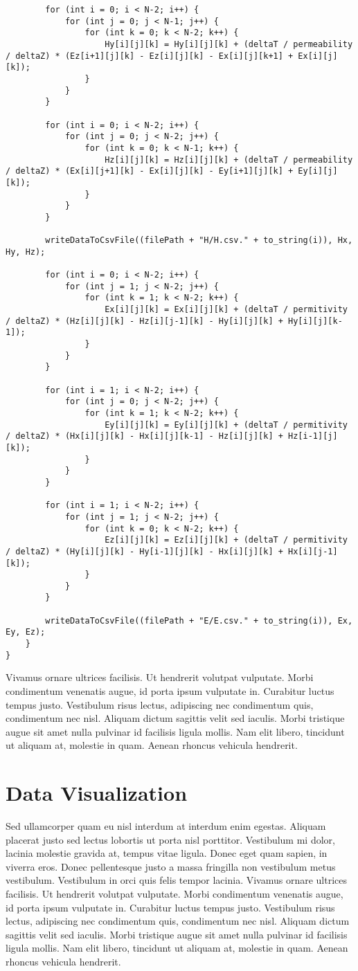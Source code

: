 \begin{verbatim}
		for (int i = 0; i < N-2; i++) {
			for (int j = 0; j < N-1; j++) {
				for (int k = 0; k < N-2; k++) {
					Hy[i][j][k] = Hy[i][j][k] + (deltaT / permeability / deltaZ) * (Ez[i+1][j][k] - Ez[i][j][k] - Ex[i][j][k+1] + Ex[i][j][k]);
				}
			}
		}
		
		for (int i = 0; i < N-2; i++) {
			for (int j = 0; j < N-2; j++) {
				for (int k = 0; k < N-1; k++) {
					Hz[i][j][k] = Hz[i][j][k] + (deltaT / permeability / deltaZ) * (Ex[i][j+1][k] - Ex[i][j][k] - Ey[i+1][j][k] + Ey[i][j][k]);
				}
			}
		}
		
		writeDataToCsvFile((filePath + "H/H.csv." + to_string(i)), Hx, Hy, Hz);
		
		for (int i = 0; i < N-2; i++) {
			for (int j = 1; j < N-2; j++) {
				for (int k = 1; k < N-2; k++) {
					Ex[i][j][k] = Ex[i][j][k] + (deltaT / permitivity / deltaZ) * (Hz[i][j][k] - Hz[i][j-1][k] - Hy[i][j][k] + Hy[i][j][k-1]);
				}
			}
		}
		
		for (int i = 1; i < N-2; i++) {
			for (int j = 0; j < N-2; j++) {
				for (int k = 1; k < N-2; k++) {
					Ey[i][j][k] = Ey[i][j][k] + (deltaT / permitivity / deltaZ) * (Hx[i][j][k] - Hx[i][j][k-1] - Hz[i][j][k] + Hz[i-1][j][k]);
				}
			}
		}
		
		for (int i = 1; i < N-2; i++) {
			for (int j = 1; j < N-2; j++) {
				for (int k = 0; k < N-2; k++) {
					Ez[i][j][k] = Ez[i][j][k] + (deltaT / permitivity / deltaZ) * (Hy[i][j][k] - Hy[i-1][j][k] - Hx[i][j][k] + Hx[i][j-1][k]);
				}
			}
		}
		
		writeDataToCsvFile((filePath + "E/E.csv." + to_string(i)), Ex, Ey, Ez);
	}
}
\end{verbatim}


Vivamus ornare ultrices facilisis. Ut hendrerit volutpat vulputate. Morbi condimentum venenatis augue, id porta ipsum vulputate in. Curabitur luctus tempus justo. Vestibulum risus lectus, adipiscing nec condimentum quis, condimentum nec nisl. Aliquam dictum sagittis velit sed iaculis. Morbi tristique augue sit amet nulla pulvinar id facilisis ligula mollis. Nam elit libero, tincidunt ut aliquam at, molestie in quam. Aenean rhoncus vehicula hendrerit.

\section{Data Visualization}
Sed ullamcorper quam eu nisl interdum at interdum enim egestas. Aliquam placerat justo sed lectus lobortis ut porta nisl porttitor. Vestibulum mi dolor, lacinia molestie gravida at, tempus vitae ligula. Donec eget quam sapien, in viverra eros. Donec pellentesque justo a massa fringilla non vestibulum metus vestibulum. Vestibulum in orci quis felis tempor lacinia. Vivamus ornare ultrices facilisis. Ut hendrerit volutpat vulputate. Morbi condimentum venenatis augue, id porta ipsum vulputate in. Curabitur luctus tempus justo. Vestibulum risus lectus, adipiscing nec condimentum quis, condimentum nec nisl. Aliquam dictum sagittis velit sed iaculis. Morbi tristique augue sit amet nulla pulvinar id facilisis ligula mollis. Nam elit libero, tincidunt ut aliquam at, molestie in quam. Aenean rhoncus vehicula hendrerit.